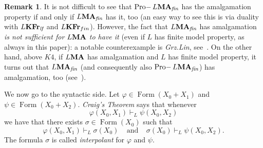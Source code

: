 \documentclass{article}
\theoremstyle{definition}
\newtheorem{rem}{Remark}
\DeclareMathOperator{\Formulas}{Form}
\DeclareMathOperator{\Pro}{Pro-}
\newcommand{\KFr}{\textup{\textbf{KFr}}}
\newcommand{\MA}{\textup{\textbf{MA}}}
\newcommand{\fin}{\textit{fin}}
\newcommand{\lf}{\textit{lf}}
\begin{document}
\begin{rem}\label{rem:grz}
It is not difficult to see that
$\Pro L\MA_\fin$ has the amalgamation property if and only if $L\MA_\fin$
has it, too (an easy way to see this is via duality with $L\KFr_\lf$ and $L\KFr_{fin}$). However, the fact that $L\MA_\fin$ has amalgamation \emph{is not sufficient for $L\MA$ to have it} (even if $L$ has finite model property, as always in this paper): a notable counterexample is \emph{Grz.Lin}, see~\cite{Mak82}. 
On the other hand, above $K4$, if $L\MA$ has amalgamation and $L$ has finite model property, it turns out that $L\MA_\fin$ (and consequently also $\Pro L\MA_\fin$) has amalgamation, too (see~\cite[Proposition 2.20]{Ghi-Zaw}).
\end{rem}


We now go to the syntactic side. Let $\varphi \in \Formulas(X_0+X_1)$ and $\psi \in \Formulas(X_0+X_2)$.  \emph{Craig's Theorem} says that whenever
$$\varphi(X_0,X_1) \vdash_L \psi(X_0,X_2)$$
we have that there exists $\sigma \in \Formulas(X_0)$ such that
$$\varphi(X_0,X_1) \vdash_L \sigma(X_0) ~~~~~\text{and}~~~~~ \sigma(X_0) \vdash_L \psi(X_0,X_2).$$
The formula $\sigma$ is called \emph{interpolant} for $\varphi$ and $\psi$.
\end{document}
